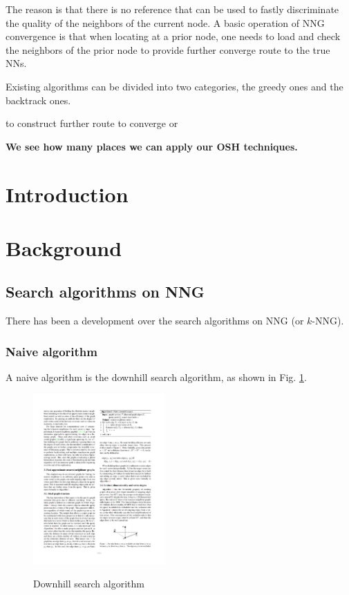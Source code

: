 \documentclass{article} %
\begin{document}
The reason is that there is no reference that can be used to fastly discriminate the quality of the neighbors of the current node.
A basic operation of NNG convergence is that when locating at a prior node, one needs to load and check the neighbors of the prior node to provide further converge route to the true NNs.

Existing algorithms can be divided into two categories, the greedy ones and the backtrack ones.

to construct further route to converge or 



\textbf{We see how many places we can apply our OSH techniques.}

\section{Introduction}\label{sec:intro}

\section{Background}\label{sec:back}
\subsection{Search algorithms on NNG}\label{ssec:search_algorithm}
There has been a development over the search algorithms on NNG (or $k$-NNG).

\subsubsection{Naive algorithm}\label{sssec:naive}
A naive algorithm is the downhill search algorithm, as shown in Fig. \ref{fig:search_downhill}.
\begin{figure}[h]
	\centering
	\includegraphics[width=0.45\textwidth]{search_downhill.pdf} \\
	\caption{Downhill search algorithm}\label{fig:search_downhill}
\end{figure}
\end{document}
